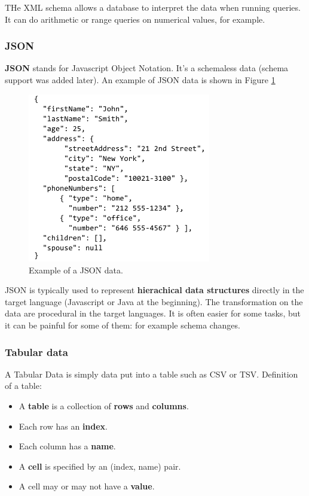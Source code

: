 \documentclass[a4paper,11pt,twoside]{article}
\begin{document}
THe XML schema allows a database to interpret the data when running queries. It can do arithmetic or range queries on numerical values, for example.

\subsubsection{JSON}

{\bf JSON} stands for Javascript Object Notation. It's a schemaless data (schema support was added later). An example of JSON data is shown in Figure \ref{pic:json}

\begin{figure}[H]%
 \centering
 \includegraphics[width=8cm]{./pic/json}
 \caption{\label{pic:json} Example of a JSON data.}
\end{figure}

JSON is typically used to represent {\bf hierachical data structures} directly in the target language (Javascript or Java at the beginning). The transformation on the data are procedural in the target languages. It is often easier for some tasks, but it can be painful for some of them: for example schema changes.

\subsubsection{Tabular data}

A Tabular Data is simply data put into a table such as CSV or TSV. Definition of a table:
\begin{itemize}
 \item A {\bf table} is a collection of {\bf rows} and {\bf columns}.
 \item Each row has an {\bf index}.
 \item Each column has a {\bf name}.
 \item A {\bf cell} is specified by an (index, name) pair.
 \item A cell may or may not have a {\bf value}.
\end{itemize}
\end{document}
